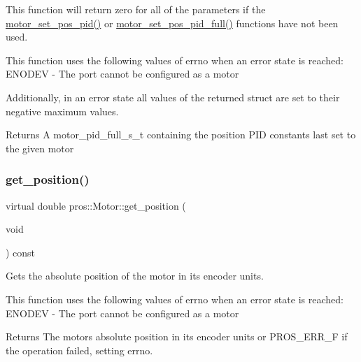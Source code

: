 This function will return zero for all of the parameters if the \hyperlink{motors_8h_a389e60d01741d5947a9b7330c6c8bbf7}{motor\+\_\+set\+\_\+pos\+\_\+pid()} or \hyperlink{motors_8h_a1d3273573e296507914d2626121f19ce}{motor\+\_\+set\+\_\+pos\+\_\+pid\+\_\+full()} functions have not been used.

This function uses the following values of errno when an error state is reached\+: E\+N\+O\+D\+EV -\/ The port cannot be configured as a motor

Additionally, in an error state all values of the returned struct are set to their negative maximum values.

\begin{DoxyReturn}{Returns}
A motor\+\_\+pid\+\_\+full\+\_\+s\+\_\+t containing the position P\+ID constants last set to the given motor 
\end{DoxyReturn}
\mbox{\label{classpros_1_1Motor_a70e725a94ec42dc7cbb3e460c36dcad3}} 
\subsubsection{\texorpdfstring{get\+\_\+position()}{get\_position()}}
{\footnotesize\ttfamily virtual double pros\+::\+Motor\+::get\+\_\+position (\begin{DoxyParamCaption}\item[{void}]{ }\end{DoxyParamCaption}) const\hspace{0.3cm}{\ttfamily [virtual]}}



Gets the absolute position of the motor in its encoder units. 

This function uses the following values of errno when an error state is reached\+: E\+N\+O\+D\+EV -\/ The port cannot be configured as a motor

\begin{DoxyReturn}{Returns}
The motor\textquotesingle{}s absolute position in its encoder units or P\+R\+O\+S\+\_\+\+E\+R\+R\+\_\+F if the operation failed, setting errno. 
\end{DoxyReturn}
\mbox{\label{classpros_1_1Motor_a51b75dc245257487116e64fa2904d521}} 
